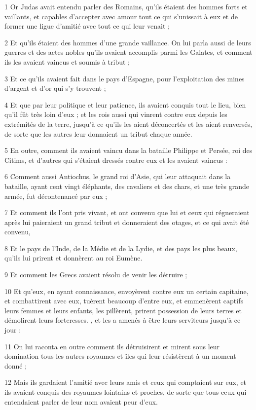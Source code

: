 \par 1 Or Judas avait entendu parler des Romains, qu'ils étaient des hommes forts et vaillants, et capables d'accepter avec amour tout ce qui s'unissait à eux et de former une ligue d'amitié avec tout ce qui leur venait ;
\par 2 Et qu'ils étaient des hommes d'une grande vaillance. On lui parla aussi de leurs guerres et des actes nobles qu'ils avaient accomplis parmi les Galates, et comment ils les avaient vaincus et soumis à tribut ;
\par 3 Et ce qu'ils avaient fait dans le pays d'Espagne, pour l'exploitation des mines d'argent et d'or qui s'y trouvent ;
\par 4 Et que par leur politique et leur patience, ils avaient conquis tout le lieu, bien qu'il fût très loin d'eux ; et les rois aussi qui vinrent contre eux depuis les extrémités de la terre, jusqu'à ce qu'ils les aient déconcertés et les aient renversés, de sorte que les autres leur donnaient un tribut chaque année.
\par 5 En outre, comment ils avaient vaincu dans la bataille Philippe et Persée, roi des Citims, et d'autres qui s'étaient dressés contre eux et les avaient vaincus :
\par 6 Comment aussi Antiochus, le grand roi d'Asie, qui leur attaquait dans la bataille, ayant cent vingt éléphants, des cavaliers et des chars, et une très grande armée, fut décontenancé par eux ;
\par 7 Et comment ils l'ont pris vivant, et ont convenu que lui et ceux qui régneraient après lui paieraient un grand tribut et donneraient des otages, et ce qui avait été convenu,
\par 8 Et le pays de l'Inde, de la Médie et de la Lydie, et des pays les plus beaux, qu'ils lui prirent et donnèrent au roi Eumène.
\par 9 Et comment les Grecs avaient résolu de venir les détruire ;
\par 10 Et qu'eux, en ayant connaissance, envoyèrent contre eux un certain capitaine, et combattirent avec eux, tuèrent beaucoup d'entre eux, et emmenèrent captifs leurs femmes et leurs enfants, les pillèrent, prirent possession de leurs terres et démolirent leurs forteresses. , et les a amenés à être leurs serviteurs jusqu'à ce jour :
\par 11 On lui raconta en outre comment ils détruisirent et mirent sous leur domination tous les autres royaumes et îles qui leur résistèrent à un moment donné ;
\par 12 Mais ils gardaient l'amitié avec leurs amis et ceux qui comptaient sur eux, et ils avaient conquis des royaumes lointains et proches, de sorte que tous ceux qui entendaient parler de leur nom avaient peur d'eux.
